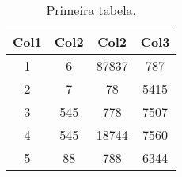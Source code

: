 \begin{table}[h!]
    \centering
    \begin{tabular}{||c c c c||} 
        \hline
        Col1 & Col2 & Col2 & Col3 \\ [0.5ex] 
        \hline\hline
        1 & 6 & 87837 & 787 \\ 
        2 & 7 & 78 & 5415 \\
        3 & 545 & 778 & 7507 \\
        4 & 545 & 18744 & 7560 \\
        5 & 88 & 788 & 6344 \\ [1ex] 
        \hline
    \end{tabular}
    \caption{Primeira tabela.}
    \label{table:1}
\end{table}